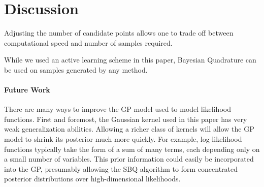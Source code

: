 \documentclass{article}
\newlength\fheight  %
\newlength\fwidth
\begin{document}

%    

%
%

\begin{figure}
	\centering
	\setlength\fheight{4cm} 
	\setlength\fwidth{4cm}
	
\end{figure}

\begin{figure}
	\centering
	\setlength\fheight{4cm} 
	\setlength\fwidth{4cm}
	
\end{figure}

%	 

%	 

\begin{figure}
	\centering
	\setlength\fheight{4cm} 
	\setlength\fwidth{4cm}
	
\end{figure}

\section{Discussion}

Adjusting the number of candidate points allows one to trade off between computational speed and number of samples required.

While we used an active learning scheme in this paper, Bayesian Quadrature can be used on samples generated by any method.

\paragraph{Future Work}There are many ways to improve the GP model used to model likelihood functions.  First and foremost, the Gaussian kernel used in this paper has very weak generalization abilities.  Allowing a richer class of kernels will allow the GP model to shrink its posterior much more quickly.  For example, log-likelihood functions typically take the form of a sum of many terms, each depending only on a small number of variables.  This prior information could easily be incorporated into the GP, presumably allowing the SBQ algorithm to form concentrated posterior distributions over high-dimensional likelihoods.
\end{document}
